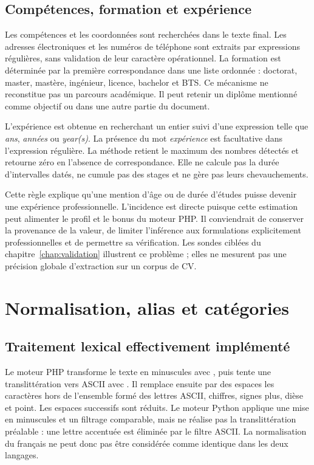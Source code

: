 \subsection{Compétences, formation et expérience}

Les compétences et les coordonnées sont recherchées dans le texte final. Les adresses électroniques et les numéros de téléphone sont extraits par expressions régulières, sans validation de leur caractère opérationnel. La formation est déterminée par la première correspondance dans une liste ordonnée : doctorat, master, mastère, ingénieur, licence, bachelor et BTS. Ce mécanisme ne reconstitue pas un parcours académique. Il peut retenir un diplôme mentionné comme objectif ou dans une autre partie du document.

L'expérience est obtenue en recherchant un entier suivi d'une expression telle que \emph{ans}, \emph{années} ou \emph{year(s)}. La présence du mot \emph{expérience} est facultative dans l'expression régulière. La méthode retient le maximum des nombres détectés et retourne zéro en l'absence de correspondance. Elle ne calcule pas la durée d'intervalles datés, ne cumule pas des stages et ne gère pas leurs chevauchements.

Cette règle explique qu'une mention d'âge ou de durée d'études puisse devenir une expérience professionnelle. L'incidence est directe puisque cette estimation peut alimenter le profil et le bonus du moteur PHP. Il conviendrait de conserver la provenance de la valeur, de limiter l'inférence aux formulations explicitement professionnelles et de permettre sa vérification. Les sondes ciblées du chapitre~\ref{chap:validation} illustrent ce problème ; elles ne mesurent pas une précision globale d'extraction sur un corpus de CV.

\section{Normalisation, alias et catégories}

\subsection{Traitement lexical effectivement implémenté}

Le moteur PHP transforme le texte en minuscules avec , puis tente une translittération vers ASCII avec . Il remplace ensuite par des espaces les caractères hors de l'ensemble formé des lettres ASCII, chiffres, signes plus, dièse et point. Les espaces successifs sont réduits. Le moteur Python applique une mise en minuscules et un filtrage comparable, mais ne réalise pas la translittération préalable : une lettre accentuée est éliminée par le filtre ASCII. La normalisation du français ne peut donc pas être considérée comme identique dans les deux langages.


